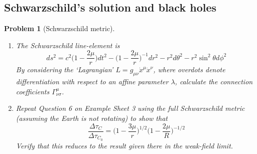 \documentclass[a4paper]{article}
\theoremstyle{new2}
\theoremstyle{new}
\newtheorem{qns}{Problem}[section]
\begin{document}
\subsection*{Schwarzschild's solution and black holes}
\begin{qns}[Schwarzschild metric]\leavevmode
\begin{enumerate}[label=(\alph*)]
\item The Schwarzschild line-element is
$$ds^2=c^2\bigg(1-\frac{2\mu}{r}\bigg)dt^2-\bigg(1-\frac{2\mu}{r}\bigg)^{-1}dr^2-r^2d\theta^2-r^2\sin^2\theta d\phi^2$$
By considering the `Lagrangian' $L=g_{\mu\nu}\dot{x}^\mu\dot{x}^\nu$, where overdots denote differentiation with respect to an affine parameter $\lambda$, calculate the connection coefficients $\Gamma^\mu_{\nu\sigma}$. 
\item Repeat Question 6 on Example Sheet 3 using the full Schwarzschild metric (assuming the Earth is not rotating) to show that
$$\frac{\Delta\tau_C}{\Delta\tau_{C_0}}=\bigg(1-\frac{3\mu}{r}\bigg)^{1/2}\bigg(1-\frac{2\mu}{R}\bigg)^{-1/2}$$
Verify that this reduces to the result given there in the weak-field limit.
\end{enumerate}
\end{qns}
\end{document}
